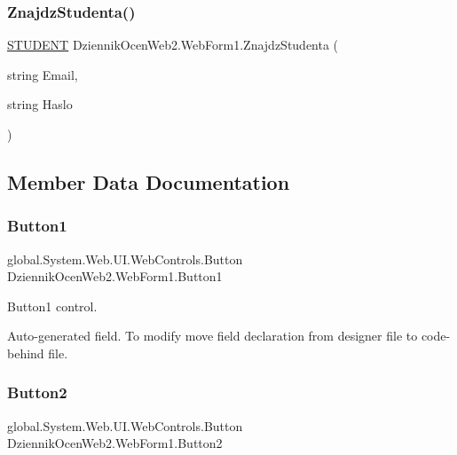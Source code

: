 \subsubsection{\texorpdfstring{Znajdz\+Studenta()}{ZnajdzStudenta()}}
{\footnotesize\ttfamily \hyperlink{class_dziennik_ocen_web2_1_1_s_t_u_d_e_n_t}{S\+T\+U\+D\+E\+NT} Dziennik\+Ocen\+Web2.\+Web\+Form1.\+Znajdz\+Studenta (\begin{DoxyParamCaption}\item[{string}]{Email,  }\item[{string}]{Haslo }\end{DoxyParamCaption})\hspace{0.3cm}{\ttfamily [inline]}}



\subsection{Member Data Documentation}
\mbox{\label{class_dziennik_ocen_web2_1_1_web_form1_a14acc2b65cea9aecb77bb7d56ba12af6}} 
\subsubsection{\texorpdfstring{Button1}{Button1}}
{\footnotesize\ttfamily global.\+System.\+Web.\+U\+I.\+Web\+Controls.\+Button Dziennik\+Ocen\+Web2.\+Web\+Form1.\+Button1\hspace{0.3cm}{\ttfamily [protected]}}



Button1 control. 

Auto-\/generated field. To modify move field declaration from designer file to code-\/behind file. \mbox{\label{class_dziennik_ocen_web2_1_1_web_form1_ae9c1f486a6ca18c24b98d8068c6a1414}} 
\subsubsection{\texorpdfstring{Button2}{Button2}}
{\footnotesize\ttfamily global.\+System.\+Web.\+U\+I.\+Web\+Controls.\+Button Dziennik\+Ocen\+Web2.\+Web\+Form1.\+Button2\hspace{0.3cm}{\ttfamily [protected]}}



